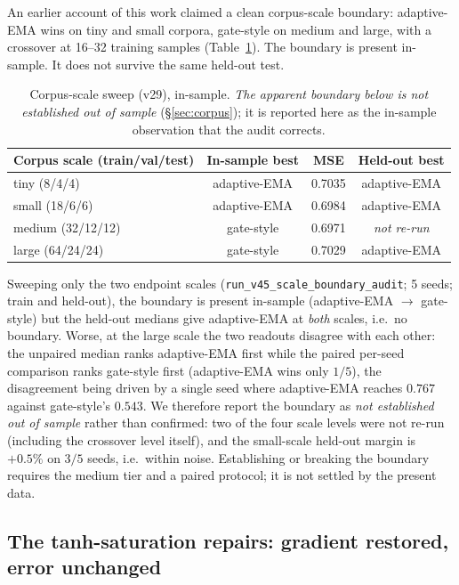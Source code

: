 \documentclass[10pt]{article}
\theoremstyle{definition}
\theoremstyle{plain}
\theoremstyle{remark}
\begin{document}
An earlier account of this work claimed a clean corpus-scale boundary: adaptive-EMA wins on tiny and small corpora, gate-style on medium and large, with a crossover at 16--32 training samples (Table~\ref{tab:scale}). The boundary is present in-sample. It does not survive the same held-out test.

\begin{table}[htbp]
\centering
\caption{Corpus-scale sweep (v29), in-sample. \emph{The apparent boundary below is not established out of sample} (\S\ref{sec:corpus}); it is reported here as the in-sample observation that the audit corrects.}
\label{tab:scale}
\small
\begin{tabular}{lccc}
\toprule
\textbf{Corpus scale (train/val/test)} & \textbf{In-sample best} & \textbf{MSE} & \textbf{Held-out best} \\
\midrule
tiny (8/4/4) & adaptive-EMA & 0.7035 & adaptive-EMA \\
small (18/6/6) & adaptive-EMA & 0.6984 & adaptive-EMA \\
medium (32/12/12) & gate-style & 0.6971 & \emph{not re-run} \\
large (64/24/24) & gate-style & 0.7029 & adaptive-EMA \\
\bottomrule
\end{tabular}
\end{table}

Sweeping only the two endpoint scales (\texttt{run\_v45\_scale\_boundary\_audit}; 5 seeds; train and held-out), the boundary is present in-sample (adaptive-EMA $\rightarrow$ gate-style) but the held-out medians give adaptive-EMA at \emph{both} scales, i.e.\ no boundary. Worse, at the large scale the two readouts disagree with each other: the unpaired median ranks adaptive-EMA first while the paired per-seed comparison ranks gate-style first (adaptive-EMA wins only $1/5$), the disagreement being driven by a single seed where adaptive-EMA reaches $0.767$ against gate-style's $0.543$. We therefore report the boundary as \emph{not established out of sample} rather than confirmed: two of the four scale levels were not re-run (including the crossover level itself), and the small-scale held-out margin is $+0.5\%$ on $3/5$ seeds, i.e.\ within noise. Establishing or breaking the boundary requires the medium tier and a paired protocol; it is not settled by the present data.

\subsection{The tanh-saturation repairs: gradient restored, error unchanged}
\label{sec:repair-exp}
\end{document}
